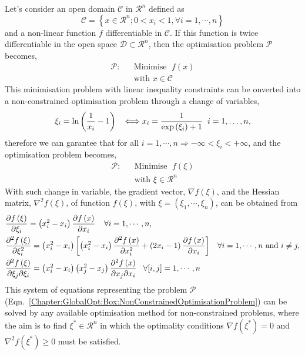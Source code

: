     Let's consider an open domain $\mathcal{C}$ in $\mathcal{R}^{n}$ defined as
\begin{displaymath}
    \mathcal{C} = \left\{x\in\mathcal{R}^{n}; 0<x_{i} <1, \forall i=1,\cdots,n\right\}
\end{displaymath}
and a non-linear function $f$ differentiable in $\mathcal{C}$. If this function is twice differentiable in the open space $\mathcal{D}\subset\mathcal{R}^{n}$, then the optimisation problem $\mathcal{P}$ becomes,
\begin{eqnarray}
   \mathcal{P}:&& \text{Minimise }\; f(x)      \nonumber \\
               && \text{with } x\in\mathcal{C}  \nonumber
\end{eqnarray}
This minimisation problem with linear inequality constraints can be onverted into a non-constrained optimisation problem through a change of variables,
\begin{displaymath}
    \xi_{i} = \ln\left(\displaystyle\frac{1}{x_{i}}-1\right)\;\;\; \Longleftrightarrow x_{i}= \displaystyle\frac{1}{\exp{\left(\xi_{i}\right)}+1} \;\; i=1,\dots,n, 
\end{displaymath}
therefore we can garantee that for all $i=1,\cdots,n \Rightarrow -\infty < \xi_{i} < +\infty$, and the optimisation problem becomes,
   \begin{eqnarray}\label{Chapter:GlobalOpt:Box:NonConstrainedOptimisationProblem}
      \mathcal{P}:&& \text{Minimise }\; f(\xi)           \\
                  && \text{with } \xi\in\mathcal{R}^{n}  \nonumber
   \end{eqnarray}
With such change in variable, the gradient vector, $\nabla f\left(\xi\right)$, and the Hessian matrix, $\nabla^{2}f\left(\xi\right)$, of function $f\left(\xi\right)$, with $\xi=\left(\xi_{1},\cdots,\xi_{n}\right)$, can be obtained from
\begin{subequations}
  \begin{align}
    & \displaystyle\frac{\partial f\left(\xi\right)}{\partial\xi_{i}} = \left(x_{i}^{2}-x_{i}\right)\displaystyle\frac{\partial f\left(x\right)}{\partial x_{i}} \;\;\;\;\forall i=1,\cdots,n, \\
    & \displaystyle\frac{\partial^{2} f\left(\xi\right)}{\partial\xi_{i}^{2}} = \left(x_{i}^{2}-x_{i}\right)\left[\left(x_{i}^{2}-x_{i}\right)\displaystyle\frac{\partial^{2} f\left(x\right)}{\partial x_{i}^{2}} + \left(2x_{i}-1\right)\displaystyle\frac{\partial f\left(x\right)}{\partial x_{i}}\right] \;\;\; \forall i=1,\cdots,n \text{ and } i\ne j, \\
    & \displaystyle\frac{\partial^{2} f\left(\xi\right)}{\partial\xi_{j}\partial\xi_{i}} = \left(x_{i}^{2}-x_{i}\right)\left(x_{j}^{2}-x_{j}\right)\displaystyle\frac{\partial^{2} f\left(x\right)}{\partial x_{j}\partial x_{i}}\;\;\; \forall [i,j]=1,\cdots,n
  \end{align}
\end{subequations}
This system of equations representing the problem $\mathcal{P}$ (Eqn.~\ref{Chapter:GlobalOpt:Box:NonConstrainedOptimisationProblem}) can be solved by any available optimisation method for non-constrained problems, where the aim is to find $\xi^{\ast}\in\mathcal{R}^{n}$ in which the optimality conditions $\nabla f\left(\xi^{\ast}\right)=0$ and $\nabla^{2} f\left(\xi^{\ast}\right) \ge 0$  must be satisfied.


